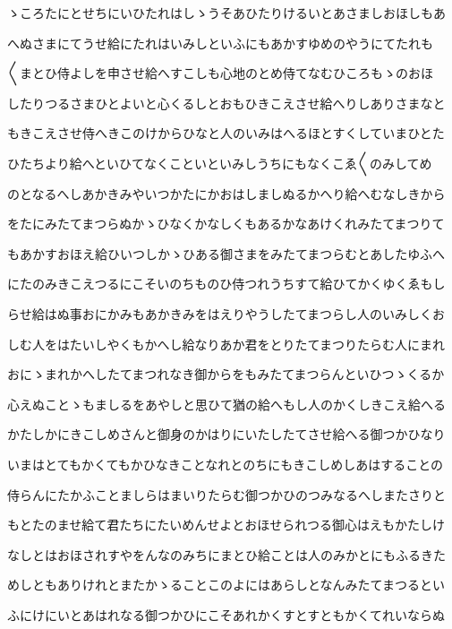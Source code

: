 \documentclass[a4paper,11pt,landscape]{ltjtarticle}
\begin{document}
\par\medskip
ゝころたにとせちにいひたれはしゝうそあひたりけるいとあさましおほしもあ
\par\medskip
へぬさまにてうせ給にたれはいみしといふにもあかすゆめのやうにてたれも
\par\medskip
〱まとひ侍よしを申させ給へすこしも心地のとめ侍てなむひころもゝのおほ
\par\medskip
したりつるさまひとよいと心くるしとおもひきこえさせ給へりしありさまなと
\par\medskip
もきこえさせ侍へきこのけからひなと人のいみはへるほとすくしていまひとた
\par\medskip
ひたちより給へといひてなくこといといみしうちにもなくこゑ〱のみしてめ
\par\medskip
のとなるへしあかきみやいつかたにかおはしましぬるかへり給へむなしきから
\par\medskip
をたにみたてまつらぬかゝひなくかなしくもあるかなあけくれみたてまつりて
\par\medskip
もあかすおほえ給ひいつしかゝひある御さまをみたてまつらむとあしたゆふへ
\par\medskip
にたのみきこえつるにこそいのちものひ侍つれうちすて給ひてかくゆくゑもし
\par\medskip
らせ給はぬ事おにかみもあかきみをはえりやうしたてまつらし人のいみしくお
\par\medskip
しむ人をはたいしやくもかへし給なりあか君をとりたてまつりたらむ人にまれ
\par\medskip
おにゝまれかへしたてまつれなき御からをもみたてまつらんといひつゝくるか
\par\medskip
心えぬことゝもましるをあやしと思ひて猶の給へもし人のかくしきこえ給へる
\par\medskip
かたしかにきこしめさんと御身のかはりにいたしたてさせ給へる御つかひなり
\par\medskip
いまはとてもかくてもかひなきことなれとのちにもきこしめしあはすることの
\par\medskip
侍らんにたかふことましらはまいりたらむ御つかひのつみなるへしまたさりと
\par\medskip
もとたのませ給て君たちにたいめんせよとおほせられつる御心はえもかたしけ
\par\medskip
なしとはおほされすやをんなのみちにまとひ給ことは人のみかとにもふるきた
\par\medskip
めしともありけれとまたかゝることこのよにはあらしとなんみたてまつるとい
\par\medskip
ふにけにいとあはれなる御つかひにこそあれかくすとすともかくてれいならぬ
\par\medskip
\end{document}
